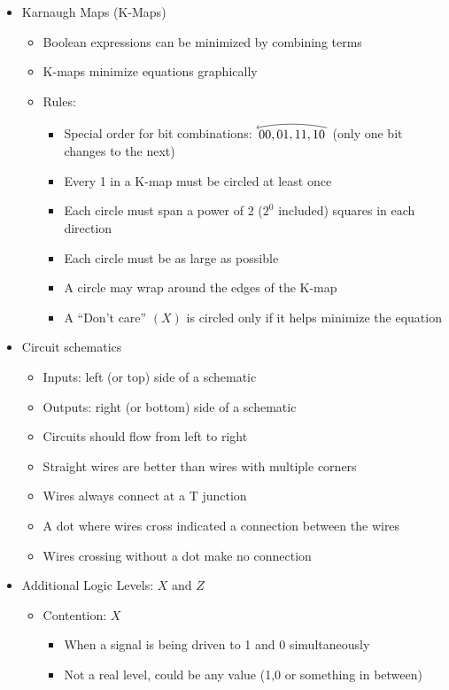\documentclass[a4paper]{article}
\begin{document}
\begin{itemize}
\item Karnaugh Maps (K-Maps)
\begin{itemize}
\item Boolean expressions can be minimized by combining terms
\item K-maps minimize equations graphically
\item Rules:
\begin{itemize}
\item Special order for bit combinations: $\mathop {00,01,11,10}\limits^{
\begin{tikzpicture}
\draw[<-] (0,0) parabola bend (1,0.1) (2,0);
\end{tikzpicture}
}$ (only one bit changes to the next)
\item Every 1 in a K-map must be circled at least once
\item Each circle must span a power of 2 ($2^0$ included) squares in each direction 
\item Each circle must be as large as possible
\item A circle may wrap around the edges of the K-map
\item A ``Don't care'' $(X)$ is circled only if it helps minimize the equation
\end{itemize}
\end{itemize}
\item Circuit schematics 
\begin{itemize}
\item Inputs: left (or top) side of a schematic
\item Outputs: right (or bottom) side of a schematic
\item Circuits should flow from left to right
\item Straight wires are better than wires with multiple corners
\item Wires always connect at a T junction
\item A dot where wires cross indicated a connection between the wires
\item Wires crossing without a dot make no connection
\end{itemize}
\item Additional Logic Levels: $X$ and $Z$
\begin{itemize}
\item Contention: $X$
\begin{itemize}
\item When a signal is being driven to 1 and 0 simultaneously
\item Not a real level, could be any value (1,0 or something in between)

\end{itemize}
\end{itemize}
\end{itemize}
\end{document}
